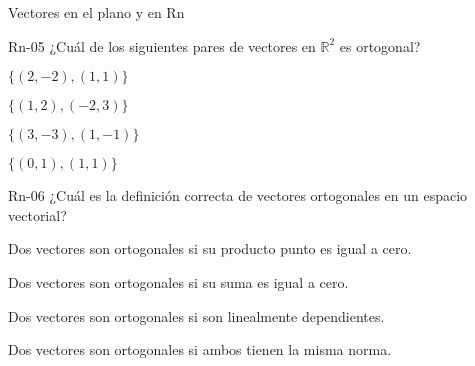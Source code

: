 \documentclass[a4,11pt]{aleph-notas}
\begin{document}
\begin{quiz}{Vectores en el plano y en Rn}
\begin{multi}[]%
    {Rn-05}
    ¿Cuál de los siguientes pares de vectores en \( \mathbb{R}^2 \) es ortogonal?
    \item* $\{ (2, -2), (1, 1) \}$
    \item $\{ (1, 2), (-2, 3) \}$
    \item $\{ (3, -3), (1, -1) \}$
    \item $\{ (0, 1), (1, 1) \}$
\end{multi}

\begin{multi}[]%
    {Rn-06}
    ¿Cuál es la definición correcta de vectores ortogonales en un espacio vectorial?
    \item* Dos vectores son ortogonales si su producto punto es igual a cero.
    \item Dos vectores son ortogonales si su suma es igual a cero.
    \item Dos vectores son ortogonales si son linealmente dependientes.
    \item Dos vectores son ortogonales si ambos tienen la misma norma.
\end{multi}

\end{quiz}
\end{document}
